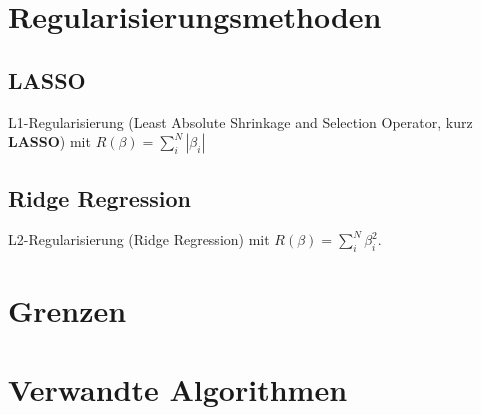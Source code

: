\section{Regularisierungsmethoden}
\subsection{LASSO}
L1-Regularisierung (Least Absolute Shrinkage and Selection Operator, kurz \textbf{LASSO}) mit $R(\beta) = \sum_{i}^N|\beta_i|$
\subsection{Ridge Regression}
L2-Regularisierung (Ridge Regression) mit $R(\beta)= \sum_{i}^N \beta_i^2$.
\section{Grenzen}
\section{Verwandte Algorithmen}